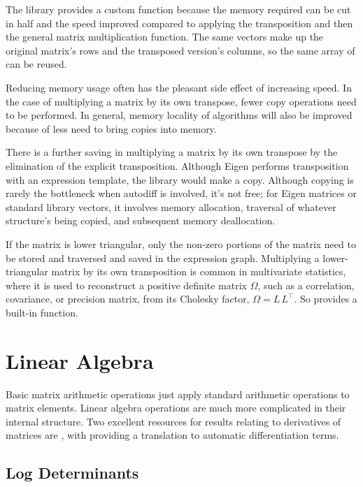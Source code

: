 \documentclass[10pt]{article}
\begin{document}
The  library provides a custom
 function because the memory required
can be cut in half and the speed improved compared to applying the
transposition and then the general matrix multiplication function. The
same vectors make up the original matrix's rows and the transposed
version's columns, so the same array of  can be reused.

Reducing memory usage often has the pleasant side effect of increasing
speed.  In the case of multiplying a matrix by its own transpose,
fewer copy operations need to be performed.  In general, memory
locality of algorithms will also be improved because of less need to
bring copies into memory.  

There is a further saving in multiplying a matrix by its own transpose
by the elimination of the explicit transposition.  Although Eigen
performs transposition with an expression template, the
 library would make a copy.  Although copying is
rarely the bottleneck when autodiff is involved, it's not free; for
Eigen matrices or standard library vectors, it involves memory
allocation, traversal of whatever structure's being copied, and
subsequent memory deallocation.

If the matrix is lower triangular, only the non-zero portions of the
matrix need to be stored and traversed and saved in the expression
graph.  Multiplying a lower-triangular matrix by its own transposition
is common in multivariate statistics, where it is used to reconstruct
a positive definite matrix $\Omega$, such as a correlation,
covariance, or precision matrix, from its Cholesky factor, $\Omega =
L\,L^{\top}$.  So  provides a built-in
 function.




\section{Linear Algebra}

Basic matrix arithmetic operations just apply standard arithmetic
operations to matrix elements.  Linear algebra operations are much
more complicated in their internal structure.  Two excellent resources
for results relating to derivatives of matrices are
\cite{PetersenPedersen:2008,MagnusNeudecker:2007}, with
\cite{Giles:2008} providing a translation to automatic differentiation
terms.

\subsection{Log Determinants}
\end{document}
